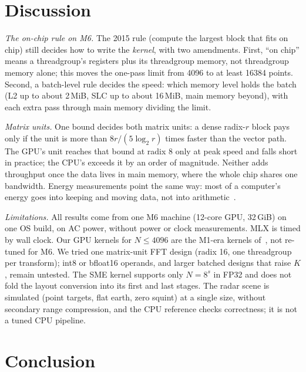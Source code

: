 \documentclass[conference]{IEEEtran}
\begin{document}
\section{Discussion}\label{sec:discussion}

\textit{The on-chip rule on M6.} The 2015 rule (compute the largest block that fits on chip) still
decides how to write the \emph{kernel}, with two amendments. First, ``on chip'' means a threadgroup's
registers plus its threadgroup memory, not threadgroup memory alone; this moves the one-pass limit from
4096 to at least 16384 points. Second, a batch-level rule decides the speed: which memory level holds
the batch (L2 up to about 2\,MiB, SLC up to about 16\,MiB, main memory beyond), with each extra pass
through main memory dividing the limit.

\textit{Matrix units.} One bound decides both matrix units: a dense radix-$r$ block pays only if the unit
is more than $8r/(5\log_2r)$ times faster than the vector path. The GPU's unit reaches that bound at
radix 8 only at peak speed and falls short in practice; the CPU's exceeds it by an order of magnitude.
Neither adds throughput once the data lives in main memory, where the whole chip shares one bandwidth.
Energy measurements point the same way: most of a computer's energy goes into keeping and moving data,
not into arithmetic~\cite{bergach2026energy}.

\textit{Limitations.} All results come from one M6 machine (12-core GPU, 32\,GiB) on one OS build, on AC
power, without power or clock measurements. MLX is timed by wall clock. Our GPU kernels for $N\le4096$
are the M1-era kernels of~\cite{bergach2026fft}, not re-tuned for M6. We tried one matrix-unit FFT
design (radix 16, one threadgroup per transform); int8 or bfloat16 operands, and larger batched designs
that raise $K$, remain untested. The SME kernel supports only $N=8^s$ in FP32 and does not fold the
layout conversion into its first and last stages. The radar scene is simulated (point targets, flat
earth, zero squint) at a single size, without secondary range compression, and the CPU reference checks
correctness; it is not a tuned CPU pipeline.

\section{Conclusion}
\end{document}
